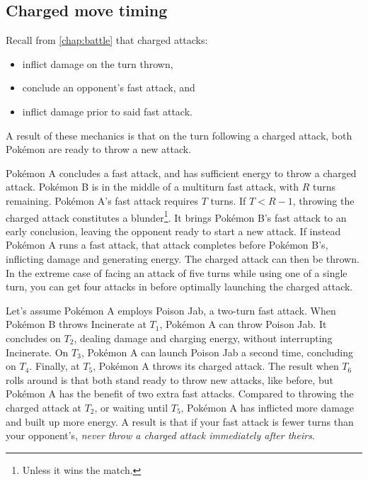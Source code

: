 \subsection{Charged move timing\label{subsec:cmt}}
Recall from \autoref{chap:battle} that charged attacks:
\begin{itemize}
\item inflict damage on the turn thrown,
\item conclude an opponent's fast attack, and
\item inflict damage prior to said fast attack.
\end{itemize}
A result of these mechanics is that on the turn following a charged attack,
 both Pokémon are ready to throw a new attack.

Pokémon A concludes a fast attack, and has sufficient energy to throw a charged attack.
Pokémon B is in the middle of a multiturn fast attack, with $R$ turns remaining.
Pokémon A's fast attack requires $T$ turns.
If $T < R-1$, throwing the charged attack constitutes a blunder\footnote{Unless it wins the match.}.
It brings Pokémon B's fast attack to an early conclusion, leaving the opponent ready to start a new attack.
If instead Pokémon A runs a fast attack, that attack completes before Pokémon B's, inflicting damage and generating energy.
The charged attack can then be thrown.
In the extreme case of facing an attack of five turns while using one of a single turn,
  you can get four attacks in before optimally launching the charged attack.

Let's assume Pokémon A employs Poison Jab, a two-turn fast attack.
When Pokémon B throws Incinerate at $T_1$, Pokémon A can throw Poison Jab.
It concludes on $T_2$, dealing damage and charging energy, without interrupting Incinerate.
On $T_3$, Pokémon A can launch Poison Jab a second time, concluding on $T_4$.
Finally, at $T_5$, Pokémon A throws its charged attack.
The result when $T_6$ rolls around is that both stand ready to throw new attacks, like before,
  but Pokémon A has the benefit of two extra fast attacks.
Compared to throwing the charged attack at $T_2$, or waiting until $T_5$,
  Pokémon A has inflicted more damage and built up more energy.
A result is that if your fast attack is fewer turns than your opponent's,
 \textit{never throw a charged attack immediately after theirs}.

